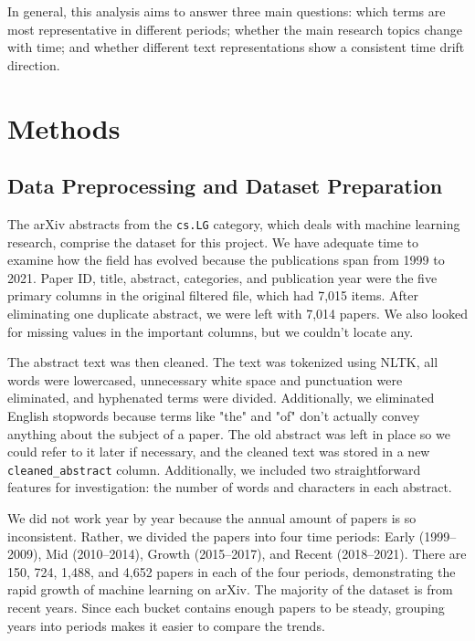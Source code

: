 \documentclass[11pt]{article}
\begin{document}
In general, this analysis aims to answer three main questions: which terms are most representative in different periods; whether the main research topics change with time; and whether different text representations show a consistent time drift direction.


\section{Methods}

\subsection{Data Preprocessing and Dataset Preparation}

The arXiv abstracts from the \texttt{cs.LG} category, which deals with machine learning research, comprise the dataset for this project. We have adequate time to examine how the field has evolved because the publications span from 1999 to 2021. Paper ID, title, abstract, categories, and publication year were the five primary columns in the original filtered file, which had 7,015 items. After eliminating one duplicate abstract, we were left with 7,014 papers. We also looked for missing values in the important columns, but we couldn't locate any.

The abstract text was then cleaned. The text was tokenized using NLTK, all words were lowercased, unnecessary white space and punctuation were eliminated, and hyphenated terms were divided. Additionally, we eliminated English stopwords because terms like "the" and "of" don't actually convey anything about the subject of a paper. The old abstract was left in place so we could refer to it later if necessary, and the cleaned text was stored in a new \texttt{cleaned\_abstract} column. Additionally, we included two straightforward features for investigation: the number of words and characters in each abstract.

We did not work year by year because the annual amount of papers is so inconsistent. Rather, we divided the papers into four time periods:
Early (1999–2009), Mid (2010–2014), Growth (2015–2017), and Recent (2018–2021). There are 150, 724, 1,488, and 4,652 papers in each of the four periods, demonstrating the rapid growth of machine learning on arXiv. The majority of the dataset is from recent years. Since each bucket contains enough papers to be steady, grouping years into periods makes it easier to compare the trends.
\end{document}
